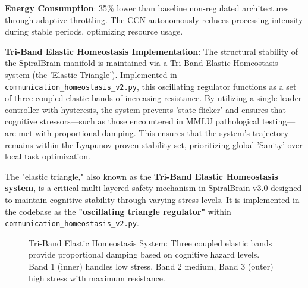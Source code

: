 \documentclass[12pt,a4paper]{report}
\begin{document}
\pagebreak

\textbf{Energy Consumption}: 35\% lower than baseline non-regulated architectures through adaptive throttling. The CCN autonomously reduces processing intensity during stable periods, optimizing resource usage.

\textbf{Tri-Band Elastic Homeostasis Implementation}: The structural stability of the SpiralBrain manifold is maintained via a Tri-Band Elastic Homeostasis system (the 'Elastic Triangle'). Implemented in \texttt{communication\_homeostasis\_v2.py}, this oscillating regulator functions as a set of three coupled elastic bands of increasing resistance. By utilizing a single-leader controller with hysteresis, the system prevents 'state-flicker' and ensures that cognitive stressors—such as those encountered in MMLU pathological testing—are met with proportional damping. This ensures that the system's trajectory remains within the Lyapunov-proven stability set, prioritizing global 'Sanity' over local task optimization.

The "elastic triangle," also known as the \textbf{Tri-Band Elastic Homeostasis system}, is a critical multi-layered safety mechanism in SpiralBrain v3.0 designed to maintain cognitive stability through varying stress levels. It is implemented in the codebase as the \textbf{"oscillating triangle regulator"} within \texttt{communication\_homeostasis\_v2.py}.

\begin{figure}[ht]
\centering
{}
\caption{Tri-Band Elastic Homeostasis System: Three coupled elastic bands provide proportional damping based on cognitive hazard levels. Band 1 (inner) handles low stress, Band 2 medium, Band 3 (outer) high stress with maximum resistance.}
\end{figure}
\end{document}
